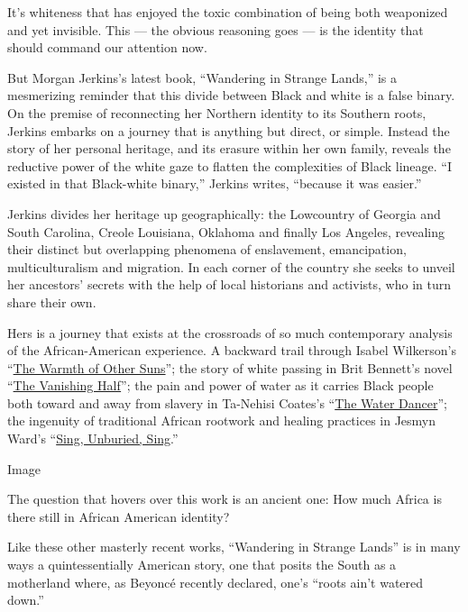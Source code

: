 It's whiteness that has enjoyed the toxic combination of being both
weaponized and yet invisible. This --- the obvious reasoning goes --- is
the identity that should command our attention now.

But Morgan Jerkins's latest book, ``Wandering in Strange Lands,'' is a
mesmerizing reminder that this divide between Black and white is a false
binary. On the premise of reconnecting her Northern identity to its
Southern roots, Jerkins embarks on a journey that is anything but
direct, or simple. Instead the story of her personal heritage, and its
erasure within her own family, reveals the reductive power of the white
gaze to flatten the complexities of Black lineage. ``I existed in that
Black-white binary,'' Jerkins writes, ``because it was easier.''

Jerkins divides her heritage up geographically: the Lowcountry of
Georgia and South Carolina, Creole Louisiana, Oklahoma and finally Los
Angeles, revealing their distinct but overlapping phenomena of
enslavement, emancipation, multiculturalism and migration. In each
corner of the country she seeks to unveil her ancestors' secrets with
the help of local historians and activists, who in turn share their own.

Hers is a journey that exists at the crossroads of so much contemporary
analysis of the African-American experience. A backward trail through
Isabel Wilkerson's
``\href{https://www.nytimes3xbfgragh.onion/2010/08/31/books/31book.html}{The
Warmth of Other Suns}''; the story of white passing in Brit Bennett's
novel
``\href{https://www.nytimes3xbfgragh.onion/2020/05/26/books/review-vanishing-half-brit-bennett.html}{The
Vanishing Half}''; the pain and power of water as it carries Black
people both toward and away from slavery in Ta-Nehisi Coates's
``\href{https://www.nytimes3xbfgragh.onion/2019/09/24/books/review/water-dancer-ta-nehisi-coates.html}{The
Water Dancer}''; the ingenuity of traditional African rootwork and
healing practices in Jesmyn Ward's
``\href{https://www.nytimes3xbfgragh.onion/2017/09/05/books/review-sing-unburied-sing-jesmyn-ward.html}{Sing,
Unburied, Sing}.''

Image

The question that hovers over this work is an ancient one: How much
Africa is there still in African American identity?

Like these other masterly recent works, ``Wandering in Strange Lands''
is in many ways a quintessentially American story, one that posits the
South as a motherland where, as Beyoncé recently declared, one's ``roots
ain't watered down.''

